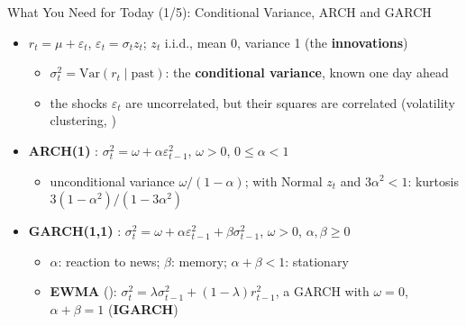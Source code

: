 \begin{frame}{What You Need for Today (1/5): Conditional Variance, ARCH and GARCH}
\itemsize{\small}
\begin{itemize}
    \item $r_t = \mu + \varepsilon_t$, $\varepsilon_t = \sigma_t z_t$; $z_t$ i.i.d., mean 0, variance 1 (the \textbf{innovations})
    \begin{itemize}
        \item $\sigma_t^2 = \mathrm{Var}(r_t \mid \text{past})$: the \textbf{conditional variance}, known one day ahead
        \item the shocks $\varepsilon_t$ are uncorrelated, but their squares are correlated (volatility clustering, )
    \end{itemize}
    \item \textbf{ARCH(1)} : $\sigma_t^2 = \omega + \alpha\varepsilon_{t-1}^2$, $\omega > 0$, $0 \le \alpha < 1$
    \begin{itemize}
        \item unconditional variance $\omega/(1 - \alpha)$; with Normal $z_t$ and $3\alpha^2 < 1$: kurtosis $3(1 - \alpha^2)/(1 - 3\alpha^2)$
    \end{itemize}
    \item \textbf{GARCH(1,1)} : $\sigma_t^2 = \omega + \alpha\varepsilon_{t-1}^2 + \beta\sigma_{t-1}^2$, $\omega > 0$, $\alpha, \beta \ge 0$
    \begin{itemize}
        \item $\alpha$: reaction to news; $\beta$: memory; $\alpha + \beta < 1$: stationary
        \item \textbf{EWMA} (): $\sigma_t^2 = \lambda\sigma_{t-1}^2 + (1 - \lambda)r_{t-1}^2$, a GARCH with $\omega = 0$, $\alpha + \beta = 1$ (\textbf{IGARCH})
    \end{itemize}
\end{itemize}
\end{frame}

